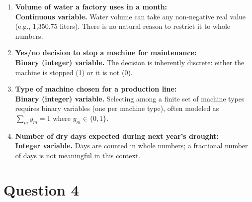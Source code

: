 \documentclass[12pt,a4paper]{article}
\begin{document}
\begin{enumerate}[label=(\alph*)]
    \item \textbf{Volume of water a factory uses in a month:} \\
    \textbf{Continuous variable.} Water volume can take any non-negative real value (e.g., 1,350.75 liters). There is no natural reason to restrict it to whole numbers.

    \item \textbf{Yes/no decision to stop a machine for maintenance:} \\
    \textbf{Binary (integer) variable.} The decision is inherently discrete: either the machine is stopped (1) or it is not (0).

    \item \textbf{Type of machine chosen for a production line:} \\
    \textbf{Binary (integer) variable.} Selecting among a finite set of machine types requires binary variables (one per machine type), often modeled as $\sum_m y_m = 1$ where $y_m \in \{0,1\}$.

    \item \textbf{Number of dry days expected during next year's drought:} \\
    \textbf{Integer variable.} Days are counted in whole numbers; a fractional number of days is not meaningful in this context.
\end{enumerate}

\section*{Question 4}
\end{document}
